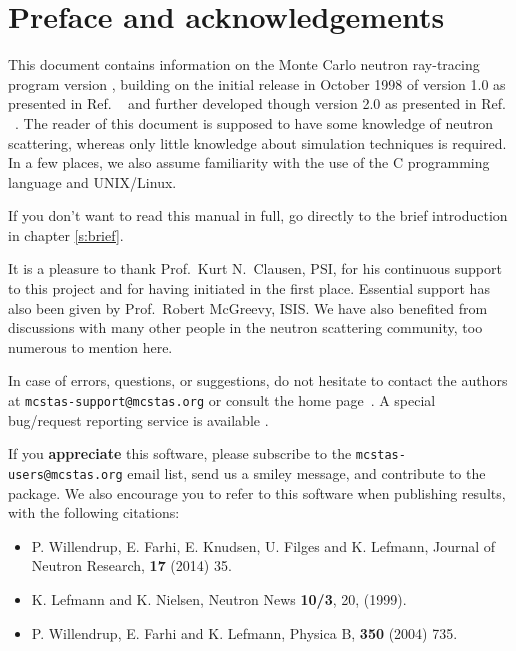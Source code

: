 
\chapter*{Preface and acknowledgements}
This document contains information on the Monte Carlo neutron
ray-tracing program \MCS version \version, building on the initial
release in October 1998 of version 1.0 as presented in
Ref. ~\cite{nn_10_20} and further developed though version 2.0 as
presented in Ref. ~\cite{mcs_ppf}.
The reader of this document is supposed to have some knowledge of neutron scattering,
whereas only little knowledge about simulation techniques is
required. In a few places, we also assume familiarity with the
use of the C programming language and UNIX/Linux.

If you don't want to read this manual in full, go directly to the brief introduction in chapter \ref{s:brief}.

It is a pleasure to thank Prof.~Kurt N.~Clausen, PSI, for his continuous
support to this project and for having initiated \MCS in the first
place. Essential support has also been given by Prof.~Robert McGreevy, ISIS.
We have also benefited from discussions with many other people in the neutron scattering
community, too numerous to mention here.

In case of errors, questions, or suggestions, do not hesitate to
contact the authors at \verb+mcstas-support@mcstas.org+
or consult the \MCS home page~\cite{mcstas_webpage}.
A special bug/request reporting service is available \cite{mczilla_webpage}.

If you {\bf appreciate} this software, please subscribe to the \verb+mcstas-users@mcstas.org+ email list, send us a smiley message, and contribute to the package. We also encourage you to refer to this software when publishing results, with the following citations:
\begin{itemize}
\item{P. Willendrup, E. Farhi, E. Knudsen, U. Filges and K. Lefmann,
    Journal of Neutron Research, {\bf 17} (2014) 35.}
\item{K. Lefmann and K. Nielsen, Neutron News {\bf 10/3}, 20, (1999).}
\item{P. Willendrup, E. Farhi and K. Lefmann, Physica B, {\bf 350} (2004) 735.}
\end{itemize}


